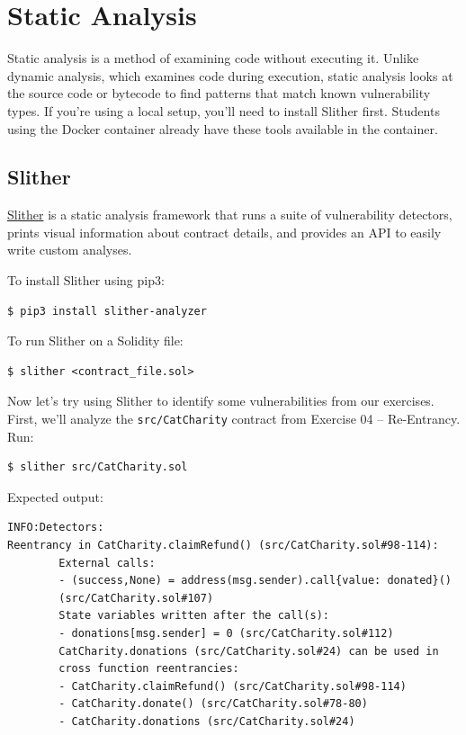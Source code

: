 \documentclass[12pt]{article}
\begin{document}
\section{Static Analysis}

Static analysis is a method of examining code without executing it. Unlike
dynamic analysis, which examines code during execution, static analysis looks at
the source code or bytecode to find patterns that match known vulnerability
types. If you're using a local setup, you'll need to install Slither first.
Students using the Docker container already have these tools available in
the container.

\subsection*{Slither}

\href{https://github.com/crytic/slither}{Slither} is a static analysis framework that runs a suite of vulnerability detectors, prints visual information about contract details, and provides an API to easily write custom analyses.

\medskip
\noindent
To install Slither using pip3:

\noindent \begin{minipage}{\textwidth}
    \begin{verbatim}
$ pip3 install slither-analyzer
\end{verbatim}
\end{minipage}

\medskip
\noindent
To run Slither on a Solidity file:

\begin{verbatim}
$ slither <contract_file.sol>
\end{verbatim}

\noindent
Now let's try using Slither to identify some vulnerabilities from our exercises. First, we'll analyze the \texttt{src/CatCharity} contract from Exercise 04 -- Re-Entrancy. Run:

\begin{verbatim}
$ slither src/CatCharity.sol
\end{verbatim}

\noindent
Expected output:
\begin{verbatim}
INFO:Detectors:
Reentrancy in CatCharity.claimRefund() (src/CatCharity.sol#98-114):
        External calls:
        - (success,None) = address(msg.sender).call{value: donated}() 
        (src/CatCharity.sol#107)
        State variables written after the call(s):
        - donations[msg.sender] = 0 (src/CatCharity.sol#112)
        CatCharity.donations (src/CatCharity.sol#24) can be used in 
        cross function reentrancies:
        - CatCharity.claimRefund() (src/CatCharity.sol#98-114)
        - CatCharity.donate() (src/CatCharity.sol#78-80)
        - CatCharity.donations (src/CatCharity.sol#24)
\end{verbatim}
\end{document}
